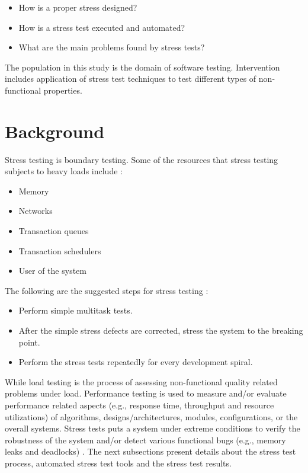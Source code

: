 \begin{itemize}
\item How is a proper stress designed?
\item How is a stress test executed and automated?
\item What are the main problems found by stress tests?
\end{itemize}

The population in this study is the domain of software testing. Intervention includes application of stress test techniques to test different types of non-functional properties.


\section{Background}


Stress testing is boundary testing. Some of the resources that stress testing subjects to heavy loads include \cite{Lewis2005}:

\begin{itemize}
\item Memory
\item Networks
\item Transaction queues
\item Transaction schedulers
\item User of the system
\end{itemize}

The following are the suggested steps for stress testing \cite{Lewis2005}:

\begin{itemize}
\item Perform simple multitask tests.
\item After the simple stress defects are corrected, stress the system to
the breaking point.
\item Perform the stress tests repeatedly for every development spiral.
\end{itemize}

While load testing is the process of assessing non-functional quality related problems under load. Performance testing is used to measure and/or evaluate performance
related aspects (e.g., response time, throughput and resource utilizations) of algorithms, designs/architectures, modules, configurations, or the overall systems. Stress tests puts a system under extreme conditions to verify the robustness of the system and/or detect various functional bugs (e.g., memory leaks and deadlocks) \cite{Afzal2009a}. The next subsections present details about the stress test process, automated stress test tools and the stress test results.


